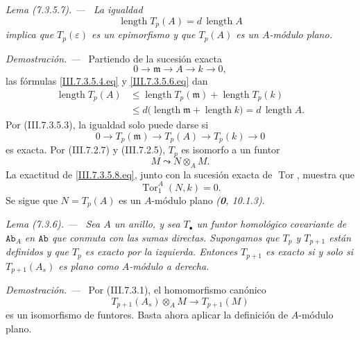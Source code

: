\documentclass[10pt,oneside]{book}
\newcommand{\cat}[1]{\mathtt{#1}}
\newcommand{\Tor}{\operatorname{Tor}}
\newcommand{\sref}[2][]{\textup{(#2)}}
\newenvironment{lemma}[1][]{\par\medskip\noindent\itshape Lema (#1). ---\ }{\par}
\newenvironment{proof}{\par\medskip\noindent\textit{Demostración. ---\ }}{\par}
\begin{document}
\begin{lemma}[7.3.5.7]
\label{III.7.3.5.7}
La igualdad
\[
  \operatorname{length}T_p(A)
  =
  d\,\operatorname{length}A
\]
implica que $T_p(\varepsilon)$ es un epimorfismo y que $T_p(A)$ es
un $A$-módulo plano.
\end{lemma}

\begin{proof}
Partiendo de la sucesión exacta
\[
  0\longrightarrow\mathfrak m
  \longrightarrow A
  \longrightarrow k
  \longrightarrow0,
\]
las fórmulas \eqref{III.7.3.5.4.eq} y
\eqref{III.7.3.5.6.eq} dan
\[
  \begin{split}
  \operatorname{length}T_p(A)
  &\leq
  \operatorname{length}T_p(\mathfrak m)
  +
  \operatorname{length}T_p(k)
  \\
  &\leq
  d\bigl(
    \operatorname{length}\mathfrak m
    +
    \operatorname{length}k
  \bigr)
  =
  d\,\operatorname{length}A.
  \end{split}
\]
Por \sref{III.7.3.5.3}, la igualdad solo puede darse si
\[
  0\longrightarrow T_p(\mathfrak m)
  \longrightarrow T_p(A)
  \longrightarrow T_p(k)
  \longrightarrow0
  \tag{7.3.5.8}\label{III.7.3.5.8.eq}
\]
es exacta. Por \sref{III.7.2.7} y \sref{III.7.2.5}, $T_p$ es
isomorfo a un funtor
\[
  M\leadsto N\otimes_A M.
\]
La exactitud de \eqref{III.7.3.5.8.eq}, junto con la sucesión exacta
de $\Tor$, muestra que
\[
  \Tor^A_1(N,k)=0.
\]
Se sigue que $N=T_p(A)$ es un $A$-módulo plano
\emph{(\textbf 0, 10.1.3)}.
\end{proof}

\begin{lemma}[7.3.6]
\label{III.7.3.6}
Sea $A$ un anillo, y sea $T_\bullet$ un funtor homológico
covariante de $\cat{Ab}_A$ en $\cat{Ab}$ que conmuta con las
sumas directas. Supongamos que $T_p$ y $T_{p+1}$ están definidos y
que $T_p$ es exacto por la izquierda. Entonces $T_{p+1}$ es exacto
si y solo si $T_{p+1}(A_s)$ es plano como $A$-módulo a derecha.
\end{lemma}

\begin{proof}
Por \sref{III.7.3.1}, el homomorfismo canónico
\[
  T_{p+1}(A_s)\otimes_A M
  \longrightarrow
  T_{p+1}(M)
\]
es un isomorfismo de funtores. Basta ahora aplicar la definición de
$A$-módulo plano.
\end{proof}
\end{document}
